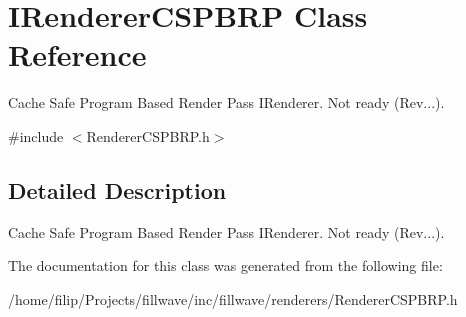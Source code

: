 \hypertarget{classIRendererCSPBRP}{}\section{I\+Renderer\+C\+S\+P\+B\+RP Class Reference}
\label{classIRendererCSPBRP}


Cache Safe Program Based Render Pass I\+Renderer. Not ready (Rev...).  




{\ttfamily \#include $<$Renderer\+C\+S\+P\+B\+R\+P.\+h$>$}



\subsection{Detailed Description}
Cache Safe Program Based Render Pass I\+Renderer. Not ready (Rev...). 

The documentation for this class was generated from the following file\+:\begin{DoxyCompactItemize}
\item 
/home/filip/\+Projects/fillwave/inc/fillwave/renderers/Renderer\+C\+S\+P\+B\+R\+P.\+h\end{DoxyCompactItemize}
